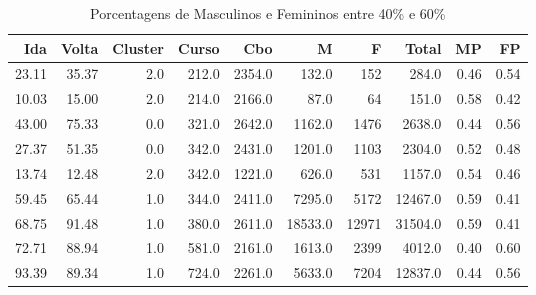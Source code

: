 \begin{table}
\centering
\caption{Porcentagens de Masculinos e Femininos entre 40\% e 60\%}
\label{tab:Fem_Masc}
\begin{tabular}{rrrrrrrrrr}
\toprule
  Ida &  Volta &  Cluster &  Curso &    Cbo &       M &     F &   Total &   MP &   FP \\
\midrule
23.11 &  35.37 &      2.0 &  212.0 & 2354.0 &   132.0 &   152 &   284.0 & 0.46 & 0.54 \\
10.03 &  15.00 &      2.0 &  214.0 & 2166.0 &    87.0 &    64 &   151.0 & 0.58 & 0.42 \\
43.00 &  75.33 &      0.0 &  321.0 & 2642.0 &  1162.0 &  1476 &  2638.0 & 0.44 & 0.56 \\
27.37 &  51.35 &      0.0 &  342.0 & 2431.0 &  1201.0 &  1103 &  2304.0 & 0.52 & 0.48 \\
13.74 &  12.48 &      2.0 &  342.0 & 1221.0 &   626.0 &   531 &  1157.0 & 0.54 & 0.46 \\
59.45 &  65.44 &      1.0 &  344.0 & 2411.0 &  7295.0 &  5172 & 12467.0 & 0.59 & 0.41 \\
68.75 &  91.48 &      1.0 &  380.0 & 2611.0 & 18533.0 & 12971 & 31504.0 & 0.59 & 0.41 \\
72.71 &  88.94 &      1.0 &  581.0 & 2161.0 &  1613.0 &  2399 &  4012.0 & 0.40 & 0.60 \\
93.39 &  89.34 &      1.0 &  724.0 & 2261.0 &  5633.0 &  7204 & 12837.0 & 0.44 & 0.56 \\
\bottomrule
\end{tabular}
\end{table}
